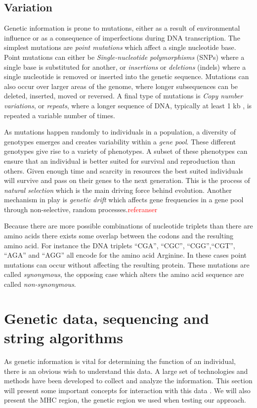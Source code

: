 \documentclass[thesis.tex]{subfiles}
\begin{document}
\subsection{Variation}
\label{sec:genetic_variation}
Genetic information is prone to mutations, either as a result of environmental influence or as a consequence of imperfections during DNA transcription. The simplest mutations are \textit{point mutations} which affect a single nucleotide base. Point mutations can either be \textit{Single-nucleotide polymorphisms} (SNPs) where a single base is substituted for another, or \textit{insertions} or \textit{deletions} (indels) where a single nucleotide is removed or inserted into the genetic sequence. Mutations can also occur over larger areas of the genome, where longer subsequences can be deleted, inserted, moved or reversed. A final type of mutations is \textit{Copy number variations}, or \textit{repeats}, where a longer sequence of DNA, typically at least 1 kb \cite{copy_number_variation_new_insights_in_genome_diversity}, is repeated a variable number of times.\\
\par\noindent
As mutations happen randomly to individuals in a population, a diversity of genotypes emerges and creates variability within a \textit{gene pool}. These different genotypes give rise to a variety of phenotypes. A subset of these phenotypes can ensure that an individual is better suited for survival and reproduction than others. Given enough time and scarcity in resources the best suited individuals will survive and pass on their genes to the next generation. This is the process of \textit{natural selection} which is the main driving force behind evolution. Another mechanism in play is \textit{genetic drift} which affects gene frequencies in a gene pool through non-selective, random processes.\textcolor{red}{referanser} \\
\par\noindent
Because there are more possible combinations of nucleotide triplets than there are amino acids there exists some overlap between the codons and the resulting amino acid. For instance the DNA triplets ``CGA'', ``CGC'', ``CGG'',``CGT'', ``AGA'' and ``AGG''  all encode for the amino acid Arginine. In these cases point mutations can occur without affecting the resulting protein. These mutations are called \textit{synonymous}, the opposing case which alters the amino acid sequence are called \textit{non-synonymous}.
\section{Genetic data, sequencing and string algorithms}
As genetic information is vital for determining the function of an individual, there is an obvious wish to understand this data. A large set of technologies and methods have been developed to collect and analyze the information. This section will present some important concepts for interaction with this data . We will also present the MHC region, the genetic region we used when testing our approach.
\end{document}
